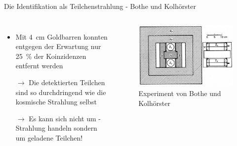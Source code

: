\documentclass[aspectratio=1610, professionalfonts, 9pt, hyperref={colorlinks=false}]{beamer}
\begin{document}
\begin{frame}{Die Identifikation als Teilchenstrahlung - Bothe und Kolhörster}
  \begin{columns}
      \begin{itemize}
        \setlength\itemsep{0.5em}
        \item Mit \SI{4}{\centi\meter} Goldbarren konnten entgegen der Erwartung nur \SI{25}{\percent} der Koinzidenzen entfernt werden
        \item [$\rightarrow$] Die detektierten Teilchen sind so durchdringend wie die kosmische Strahlung selbst
        \item [$\rightarrow$] Es kann sich nicht um \gamma-Strahlung handeln sondern um geladene Teilchen!
      \end{itemize}
        \vspace*{10px}
  
      \begin{figure}
          \centering
          \includegraphics[width=\linewidth]{images/The-experiment-of-Bothe-and-Kolhoerster-in-Ref-48-Coincidences-between-counters-Z-1.png}
          \caption{Experiment von Bothe und Kolhörster \cite{ko}}
      \end{figure}
  \end{columns}
\end{frame}
\end{document}
